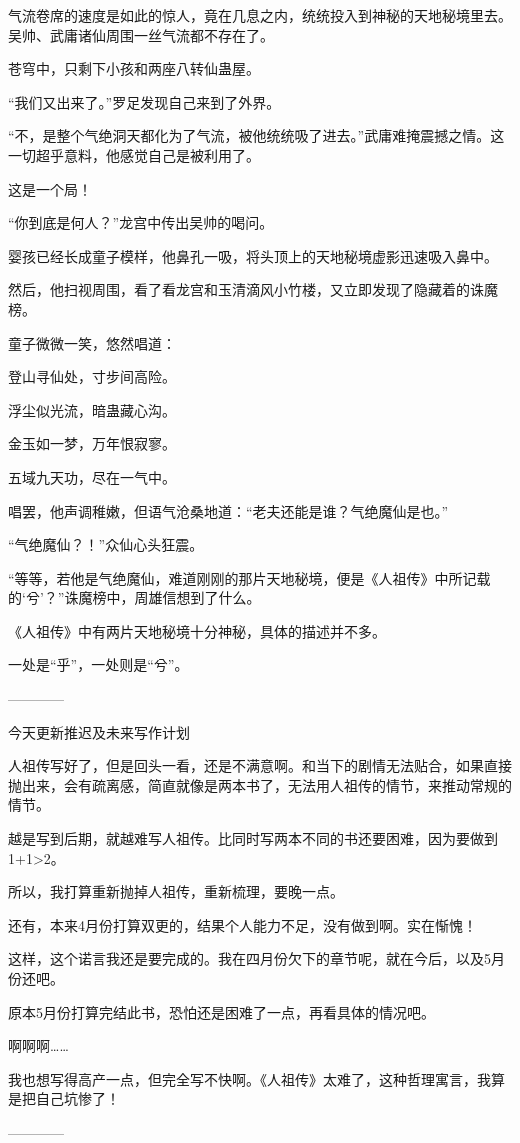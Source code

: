 \begin{this_body}
气流卷席的速度是如此的惊人，竟在几息之内，统统投入到神秘的天地秘境里去。吴帅、武庸诸仙周围一丝气流都不存在了。

苍穹中，只剩下小孩和两座八转仙蛊屋。

“我们又出来了。”罗足发现自己来到了外界。

“不，是整个气绝洞天都化为了气流，被他统统吸了进去。”武庸难掩震撼之情。这一切超乎意料，他感觉自己是被利用了。

这是一个局！

“你到底是何人？”龙宫中传出吴帅的喝问。

婴孩已经长成童子模样，他鼻孔一吸，将头顶上的天地秘境虚影迅速吸入鼻中。

然后，他扫视周围，看了看龙宫和玉清滴风小竹楼，又立即发现了隐藏着的诛魔榜。

童子微微一笑，悠然唱道：

登山寻仙处，寸步间高险。

浮尘似光流，暗蛊藏心沟。

金玉如一梦，万年恨寂寥。

五域九天功，尽在一气中。

唱罢，他声调稚嫩，但语气沧桑地道：“老夫还能是谁？气绝魔仙是也。”

“气绝魔仙？！”众仙心头狂震。

“等等，若他是气绝魔仙，难道刚刚的那片天地秘境，便是《人祖传》中所记载的‘兮’？”诛魔榜中，周雄信想到了什么。

《人祖传》中有两片天地秘境十分神秘，具体的描述并不多。

一处是“乎”，一处则是“兮”。

------------

今天更新推迟及未来写作计划

人祖传写好了，但是回头一看，还是不满意啊。和当下的剧情无法贴合，如果直接抛出来，会有疏离感，简直就像是两本书了，无法用人祖传的情节，来推动常规的情节。

越是写到后期，就越难写人祖传。比同时写两本不同的书还要困难，因为要做到1+1>2。

所以，我打算重新抛掉人祖传，重新梳理，要晚一点。

还有，本来4月份打算双更的，结果个人能力不足，没有做到啊。实在惭愧！

这样，这个诺言我还是要完成的。我在四月份欠下的章节呢，就在今后，以及5月份还吧。

原本5月份打算完结此书，恐怕还是困难了一点，再看具体的情况吧。

啊啊啊……

我也想写得高产一点，但完全写不快啊。《人祖传》太难了，这种哲理寓言，我算是把自己坑惨了！

------------

\end{this_body}

